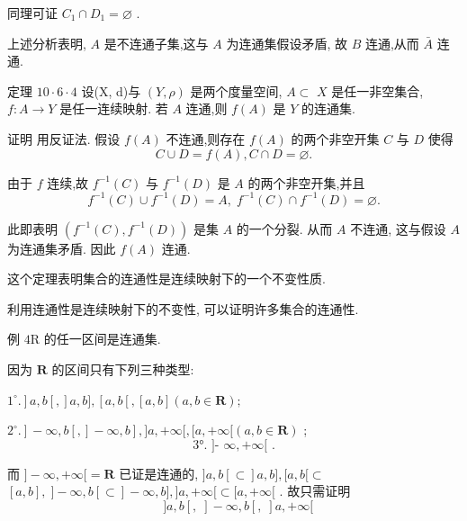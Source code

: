 同理可证 ${C}_{1} \cap  {D}_{1} = \varnothing$ .

上述分析表明, $A$ 是不连通子集,这与 $A$ 为连通集假设矛盾, 故 $B$ 连通,从而 $\bar{A}$ 连通.

定理 ${10} \cdot  6 \cdot  4$ 设(X, d)与 $\left( {Y,\rho }\right)$ 是两个度量空间, $A \subset$  $X$ 是任一非空集合, $f : A \rightarrow  Y$ 是任一连续映射. 若 $A$ 连通,则 $f\left( A\right)$ 是 $Y$ 的连通集.

证明 用反证法. 假设 $f\left( A\right)$ 不连通,则存在 $f\left( A\right)$ 的两个非空开集 $C$ 与 $D$ 使得
$$C \cup  D = f\left( A\right) ,C \cap  D = \varnothing .$$

由于 $f$ 连续,故 ${f}^{-1}\left( C\right)$ 与 ${f}^{-1}\left( D\right)$ 是 $A$ 的两个非空开集,并且
$${f}^{-1}\left( C\right)  \cup  {f}^{-1}\left( D\right)  = A,\;{f}^{-1}\left( C\right)  \cap  {f}^{-1}\left( D\right)  = \varnothing .$$

此即表明 $\left( {{f}^{-1}\left( C\right) ,{f}^{-1}\left( D\right) }\right)$ 是集 $A$ 的一个分裂. 从而 $A$ 不连通, 这与假设 $A$ 为连通集矛盾. 因此 $f\left( A\right)$ 连通.

这个定理表明集合的连通性是连续映射下的一个不变性质.

利用连通性是连续映射下的不变性, 可以证明许多集合的连通性.

例 $4\mathrm{R}$ 的任一区间是连通集.

因为 $\mathbf{R}$ 的区间只有下列三种类型:

$\left. {{1}^{ \circ  }.}\right\rbrack  a,b\left\lbrack  ,\right\rbrack  a,b\rbrack ,\left\lbrack  {a,b\left\lbrack  {,\left\lbrack  {a,b}\right\rbrack  \left( {a,b \in  \mathbf{R}}\right) ;}\right. }\right.$

$\left. {\left. {{2}^{ \circ  }.}\right\rbrack   - \infty ,b\left\lbrack  ,\right\rbrack   - \infty ,b}\right\rbrack  ,\rbrack a, + \infty \lbrack ,\lbrack a, + \infty \lbrack \left( {a,b \in  \mathbf{R}}\right)$ ;
$$\text{ 3°. ]- }\infty , + \infty \lbrack \text{ . }$$

而 $\rbrack  - \infty , + \infty \lbrack  = \mathbf{R}$ 已证是连通的, $\rbrack a,b\left\lbrack   \subset  \right\rbrack  a,b\rbrack ,\lbrack a,b\lbrack  \subset$  $\left\lbrack  {a,b}\right\rbrack  ,\;\rbrack  - \infty ,b\left\lbrack   \subset  \right\rbrack   - \infty ,b\rbrack ,\rbrack a, + \infty \lbrack  \subset  \lbrack a, + \infty \lbrack$ . 故只需证明
$$\text{  }\rbrack a,b\left\lbrack  {,\;}\right\rbrack   - \infty ,b\left\lbrack  {,\;}\right\rbrack  a, + \infty \lbrack$$

